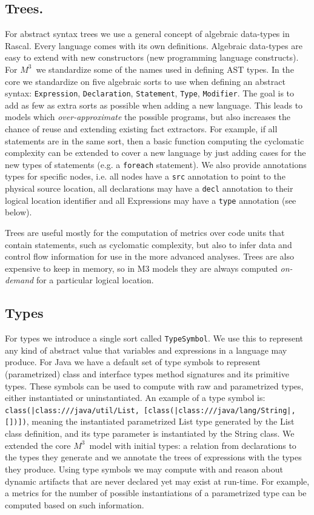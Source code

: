 \documentclass[conference]{IEEEtran}
\newcommand{\loc}[1]{\small{\texttt{#1}}}
\newcommand{\mthree}{\ensuremath{M^3}}
\begin{document}
\subsection{Trees.} For abstract syntax trees we use a general concept of
algebraic data-types in Rascal. Every language comes with its own definitions.
Algebraic data-types are easy to extend with new constructors (new programming
language constructs). For \mthree\ we standardize some of the names used in
defining AST types. In the core we standardize on five algebraic sorts to use
when defining an abstract syntax: \texttt{Expression}, \texttt{Declaration},
\texttt{Statement}, \texttt{Type}, \texttt{Modifier}. The goal is to add as
few as extra sorts as possible when adding a new language. This leads to
models which \emph{over-approximate} the possible programs, but also increases
the chance of reuse and extending existing fact extractors. For example, if
all statements are in the same sort, then a basic function computing the
cyclomatic complexity can be extended to cover a new language by just adding
cases for the new types of statements (e.g. a \texttt{foreach} statement). We
also provide annotations types for specific nodes, i.e. all nodes have a
\texttt{src} annotation to point to the physical source location, all
declarations may have a \texttt{decl} annotation to their logical location
identifier and all Expressions may have a \texttt{type} annotation (see
below).

Trees are useful mostly for the computation of metrics over code units that
contain statements, such as cyclomatic complexity, but also to infer data and
control flow information for use in the more advanced analyses. Trees are also
expensive to keep in memory, so in M3 models they are always computed \emph
{on-demand} for a particular logical location.

\subsection{Types} For types we introduce a single sort called
\texttt{TypeSymbol}. We use this to represent any kind of abstract value that
variables and expressions in a language may produce. For Java we have a
default set of type symbols to represent (parametrized) class and interface
types method signatures and its primitive types. These symbols can be used to
compute with raw and parametrized types, either instantiated or
uninstantiated. An example of a type symbol is:
\loc{class(|class:///java/util/List, [class(|class:///java/lang/String|,[])])}, meaning the instantiated
parametrized List type generated by the List class definition, and its type
parameter is instantiated by the String class. We extended the core \mthree\
model with initial types: a relation from declarations to the types they
generate and we annotate the trees of expressions with the types they produce.
Using type symbols we may compute with and reason about dynamic artifacts that
are never declared yet may exist at run-time. For example, a metrics for the
number of possible instantiations of a parametrized type can be computed based
on such information.
\end{document}
